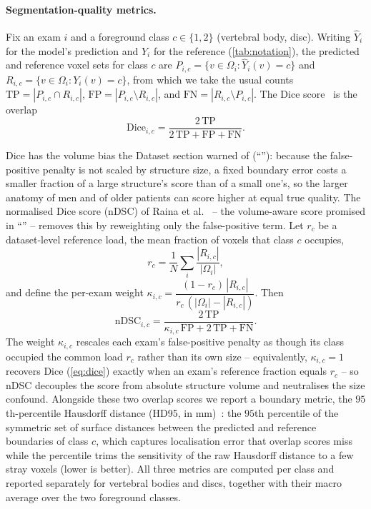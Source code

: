 \paragraph{Segmentation-quality metrics.}
Fix an exam $i$ and a foreground class $c \in \{1, 2\}$ (vertebral body, disc).
Writing $\hat{Y}_i$ for the model's prediction and $Y_i$ for the reference
(\autoref{tab:notation}), the predicted and reference voxel sets for class $c$ are
$P_{i,c} = \{v \in \Omega_i : \hat{Y}_i(v) = c\}$ and
$R_{i,c} = \{v \in \Omega_i : Y_i(v) = c\}$, from which we take the usual counts
$\mathrm{TP} = |P_{i,c} \cap R_{i,c}|$, $\mathrm{FP} = |P_{i,c} \setminus R_{i,c}|$,
and $\mathrm{FN} = |R_{i,c} \setminus P_{i,c}|$. The Dice
score~\cite{dice1945measures} is the overlap
\begin{equation}
  \mathrm{Dice}_{i,c}
  = \frac{2\,\mathrm{TP}}{2\,\mathrm{TP} + \mathrm{FP} + \mathrm{FN}}.
  \label{eq:dice}
\end{equation}

Dice has the volume bias the Dataset section warned of (``''):
because the false-positive penalty is not scaled by structure size, a fixed
boundary error costs a smaller fraction of a large structure's score than of a
small one's, so the larger anatomy of men and of older patients can score higher
at equal true quality. The normalised Dice score (nDSC) of
Raina et al.~\cite{raina2023ndsc} -- the volume-aware score promised in
``'' -- removes this by reweighting only the false-positive
term. Let $r_c$ be a dataset-level reference load, the mean fraction of
voxels that class $c$ occupies,
\begin{equation}
  r_c = \frac{1}{N}\sum_{i} \frac{|R_{i,c}|}{|\Omega_i|},
  \label{eq:load}
\end{equation}
and define the per-exam weight
$\kappa_{i,c} = \dfrac{(1 - r_c)\,|R_{i,c}|}{r_c\,(|\Omega_i| - |R_{i,c}|)}$. Then
\begin{equation}
  \mathrm{nDSC}_{i,c}
  = \frac{2\,\mathrm{TP}}{\kappa_{i,c}\,\mathrm{FP} + 2\,\mathrm{TP} + \mathrm{FN}}.
  \label{eq:ndsc}
\end{equation}
The weight $\kappa_{i,c}$ rescales each exam's false-positive penalty as though its
class occupied the common load $r_c$ rather than its own size -- equivalently,
$\kappa_{i,c} = 1$ recovers Dice (\autoref{eq:dice}) exactly when an exam's
reference fraction equals $r_c$ -- so nDSC decouples the score from absolute
structure volume and neutralises the size confound. Alongside these two overlap
scores we report a boundary metric, the $95$th-percentile Hausdorff distance
(HD95, in mm)~\cite{taha2015metrics}: the $95$th percentile of the symmetric set
of surface distances between the predicted and reference boundaries of class $c$,
which captures localisation error that overlap scores miss while the percentile
trims the sensitivity of the raw Hausdorff distance to a few stray voxels (lower
is better). All three metrics are computed per class and reported separately for
vertebral bodies and discs, together with their macro average over the two
foreground classes.

